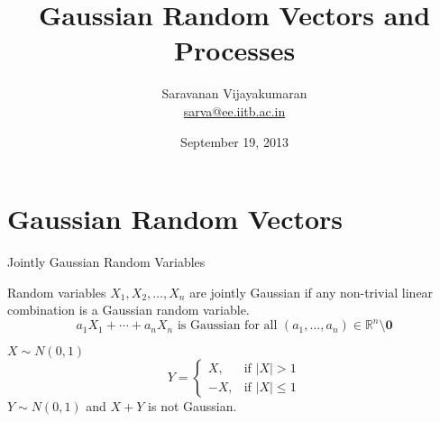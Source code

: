 \documentclass[t]{beamer}
\title[EE 703]{Gaussian Random Vectors and Processes}
\author[Saravanan V]
{
  Saravanan Vijayakumaran\\
  \href{mailto:sarva@ee.iitb.ac.in}{sarva@ee.iitb.ac.in}
}
\institute[IIT Bombay]
{
  Department of Electrical Engineering\\
  Indian Institute of Technology Bombay
}
\date{September 19, 2013}
\begin{document}
\begin{frame}
  \titlepage
\end{frame}

\section{Gaussian Random Vectors}
\begin{frame}{Jointly Gaussian Random Variables}
  \footnotesize
  \pause
  \begin{definition}
  Random variables $X_1,X_2,\ldots,X_n$ are jointly Gaussian if any non-trivial linear combination is a Gaussian random variable.
  \pause
  \begin{equation*}
    a_1X_1+\cdots+a_nX_n \text{ is Gaussian for all } (a_1,\ldots,a_n) \in \mathbb{R}^n \setminus \mathbf{0}
  \end{equation*}
  \end{definition}
  \pause
  \begin{example}
  $X\sim N(0,1)$
  \begin{equation*}
    Y = \left\{
          \begin{array}{rr}
          X, & \text{if } \lvert X \rvert > 1 \\
          -X, & \text{if } \lvert X \rvert \leq 1 
          \end{array}
        \right.
  \end{equation*}
  \pause
  $Y \sim N(0,1)$ \pause and $X+Y$ is not Gaussian.
  \end{example}
  \normalsize
\end{frame}
\end{document}
